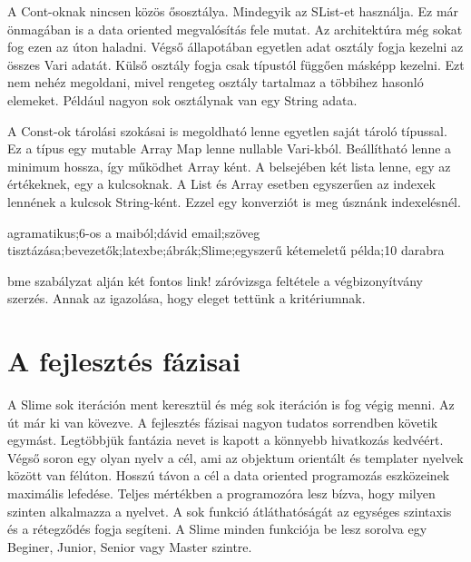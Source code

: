 {A Cont-oknak nincsen közös ősosztálya.
Mindegyik az SList-et használja.
Ez már önmagában is a data oriented megvalósítás fele mutat.
Az architektúra még sokat fog ezen az úton haladni.
Végső állapotában egyetlen adat osztály fogja kezelni az összes Vari adatát.
Külső osztály fogja csak típustól függően másképp kezelni.
Ezt nem nehéz megoldani, mivel rengeteg osztály tartalmaz a többihez hasonló elemeket.
Például nagyon sok osztálynak van egy String adata.

A Const-ok tárolási szokásai is megoldható lenne egyetlen saját tároló típussal.
Ez a típus egy mutable Array Map lenne nullable Vari-kból.
Beállítható lenne a minimum hossza, így működhet Array ként.
A belsejében két lista lenne, egy az értékeknek, egy a kulcsoknak.
A List és Array esetben egyszerűen az indexek lennének a kulcsok String-ként.
Ezzel egy konverziót is meg úsznánk indexelésnél.

agramatikus;6-os a maiból;dávid email;szöveg tisztázása;bevezetők;latexbe;ábrák;Slime;egyszerű kétemeletű példa;10 darabra

bme szabályzat alján két fontos link!
záróvizsga feltétele a végbizonyítvány szerzés.
Annak az igazolása, hogy eleget tettünk a kritériumnak.




\section{A fejlesztés fázisai}
A Slime sok iteráción ment keresztül és még sok iteráción is fog végig menni.
Az út már ki van kövezve. 
A fejlesztés fázisai nagyon tudatos sorrendben követik egymást. 
Legtöbbjük fantázia nevet is kapott a könnyebb hivatkozás kedvéért.
Végső soron egy olyan nyelv a cél, ami az objektum orientált és templater nyelvek között van félúton. 
Hosszú távon a cél a data oriented programozás eszközeinek maximális lefedése. 
Teljes mértékben a programozóra lesz bízva, hogy milyen szinten alkalmazza a nyelvet.
A sok funkció átláthatóságát az egységes szintaxis és a rétegződés fogja segíteni.
A Slime minden funkciója be lesz sorolva egy Beginer, Junior, Senior vagy Master szintre.

}
